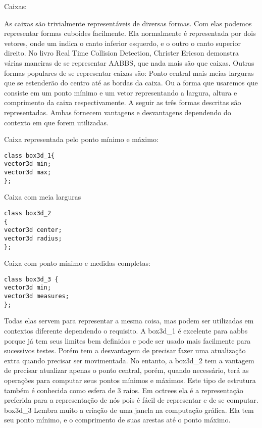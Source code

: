 Caixas: 

As caixas são trivialmente representáveis de diversas formas. Com elas podemos
representar formas cuboides facilmente. Ela normalmente é representada por dois
vetores, onde um indica o canto inferior esquerdo, e o outro o canto superior
direito. No livro Real Time Collision Detection, Christer Ericson demonstra
várias maneiras de se representar AABBS, que nada mais são que caixas.
Outras formas populares de se representar caixas são:
Ponto central mais meias larguras que se estenderão do centro até as bordas da caixa.
Ou a forma que usaremos que consiste em um ponto mínimo e um vetor
representando a largura, altura e comprimento da caixa respectivamente.
A seguir as três formas descritas são representadas. Ambas fornecem vantagens e
desvantagens dependendo do contexto em que forem utilizadas.

Caixa representada pelo ponto mínimo e máximo:

\begin{lstlisting}[caption={Exemplo de caixa1},label={lst:box1}]
class box3d_1{
vector3d min;
vector3d max;
};
\end{lstlisting}

Caixa com meia larguras

\begin{lstlisting}[caption={Exemplo de caixa2},label={lst:box2}]
class box3d_2
{
vector3d center;
vector3d radius;
};
\end{lstlisting}

Caixa com ponto mínimo e medidas completas:

\begin{lstlisting}[caption={Exemplo de caixa3},label={lst:box3}]
class box3d_3 {
vector3d min;
vector3d measures;
};
\end{lstlisting}

Todas elas servem para representar a mesma coisa, mas podem ser utilizadas em
contextos diferente dependendo o requisito. A box3d_1 é excelente para aabbs
porque já tem seus limites bem definidos e pode ser usado mais facilmente para
sucessivos testes. Porém tem a desvantagem de precisar fazer uma atualização
extra quando precisar ser movimentada.
No entanto, a box3d_2 tem a vantagem de precisar atualizar apenas o ponto
central, porém, quando necessário, terá as operações para computar seus pontos
mínimos e máximos. Este tipo de estrutura também é conhecida como esfera de 3
raios. Em octrees ela é a representação preferida para a representação de nós
pois é fácil de representar e de se computar.
box3d_3 Lembra muito a criação de uma janela na computação gráfica. Ela tem seu
ponto mínimo, e o comprimento de suas arestas até o ponto máximo.

